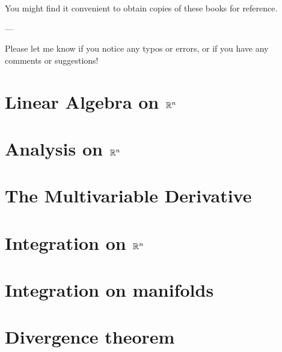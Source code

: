 \documentclass{wongtreebook}
\begin{document}
You might find it convenient to obtain copies of these books for reference.

\begin{center}
    ---
\end{center}

Please let me know if you notice any typos or errors, or if you have any comments or suggestions!

 
\afterpreface


\chapter{Linear Algebra on $\mathbb{R}^n$}


\chapter{Analysis on $\mathbb{R}^n$}


\chapter{The Multivariable Derivative}




\chapter{Integration on $\mathbb{R}^n$}

\chapter{Integration on manifolds}

\chapter{Divergence theorem}
\end{document}
